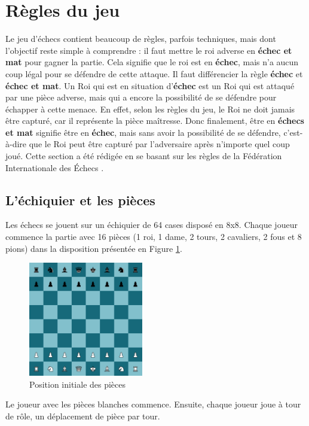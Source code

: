 \documentclass{article}
\begin{document}
\section{Règles du jeu}
Le jeu d'échecs contient beaucoup de règles, parfois techniques, mais dont l'objectif reste simple à comprendre :
il faut mettre le roi adverse en \textbf{échec et mat} pour gagner la partie. Cela signifie que le roi est en \textbf{échec},
mais n'a aucun coup légal pour se défendre de cette attaque. Il faut différencier la règle \textbf{échec} et 
\textbf{échec et mat}. Un Roi qui est en situation d'\textbf{échec} est un Roi qui est attaqué par une pièce
adverse, mais qui a encore la possibilité de se défendre pour échapper à cette menace. En effet, selon les règles du jeu, le Roi ne doit jamais être capturé, car il représente la pièce maîtresse. 
Donc finalement, être en \textbf{échecs et mat} signifie être en \textbf{échec}, mais sans avoir
la possibilité de se défendre, c'est-à-dire que le Roi peut être capturé par l'adversaire après n'importe quel coup joué.
Cette section a été rédigée en se basant sur les règles de la Fédération Internationale des Échecs \cite{FIDE2021}.

\subsection{L'échiquier et les pièces}
Les échecs se jouent sur un échiquier de 64 cases disposé en 8x8. Chaque joueur commence la partie avec 16 pièces (1 roi, 1 dame, 2 tours,
2 cavaliers, 2 fous et 8 pions) dans la disposition présentée en Figure \ref{init}.


\begin{figure}[h]
    \centering
    \includegraphics[width=\textwidth,height=5.0cm,keepaspectratio]{jeuDepart.png}
    \caption{Position initiale des pièces}
    \label{init}
\end{figure}

Le joueur avec les pièces blanches commence. Ensuite, chaque joueur joue à tour de rôle, un déplacement de pièce par tour.
\end{document}
